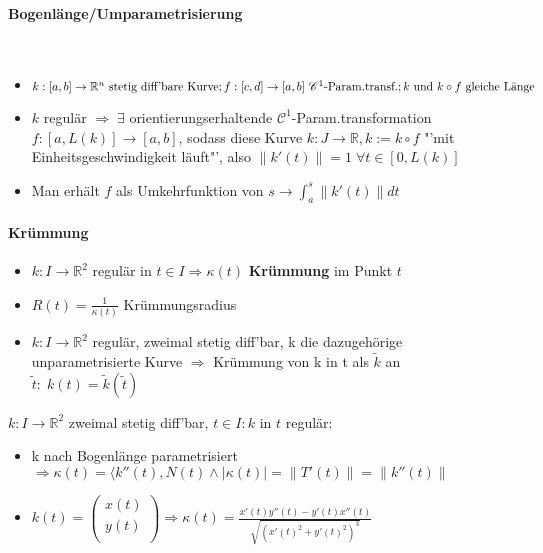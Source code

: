 \documentclass[paper=a3,paper=landscape, fontsize=9pt, DIV=30]{scrartcl}
\newcommand{\real}{{\mathbb{R}}}
\begin{document}
\begin{multicols*}{4}
  \paragraph{Bogenlänge/Umparametrisierung}\hspace{0pt} \\
\begin{itemize}
	\item   $k: [a,b] \rightarrow \real^n \ \text{stetig diff'bare Kurve};\\ f:[c,d] \rightarrow [a,b] \ \mathscr{C}^1\text{-Param.transf.}; k \ \text{und}\ k \circ f \ \text{gleiche Länge} $
	\item $k$ regulär $\Rightarrow\;\exists$ orientierungserhaltende $\mathscr{C}^1$-Param.transformation $f : [a,L(k)] \rightarrow [a,b]$, sodass diese Kurve $k: J \rightarrow \real, k := k \circ f$ "'mit Einheitsgeschwindigkeit läuft"', also $\lVert k'(t) \rVert = 1 \; \forall t \in [0,L(k)]$
	\item Man erhält $f$ als Umkehrfunktion von $s \rightarrow \int_{a}^{s} \lVert k'(t)\rVert dt$
\end{itemize}

  \paragraph{Krümmung}
  \begin{itemize}
  	\item $k: I \rightarrow \real^2$ regulär in $t \in I \Rightarrow \kappa(t)$ \textbf{Krümmung} im Punkt $t$
  	\item $R(t) = \frac{1}{\kappa(t)}$ Krümmungsradius
  	\item $k: I \rightarrow \real^2$ regulär, zweimal stetig diff'bar, k die dazugehörige unparametrisierte Kurve $\Rightarrow$ Krümmung von k in t als $\tilde{k}$ an $\tilde{t}:\;k(t)=\tilde{k}(\tilde{t})$
  \end{itemize}
	$k: I \rightarrow \real^2$ zweimal stetig diff'bar, $t \in I: k$ in $t$ regulär:
	\begin{itemize}
		\item k nach Bogenlänge parametrisiert $\Rightarrow \kappa(t)=\langle k''(t), N(t) \wedge \lvert \kappa(t)\rvert = \lVert T'(t) \rVert = \lVert k''(t) \rVert$
		\item $k(t) =
		\begin{pmatrix}
			x(t)\\y(t)\\
		\end{pmatrix}
		\Rightarrow \kappa(t)=\frac{x'(t)y''(t)-y'(t)x''(t)}{\sqrt{(x'(t)^2+y'(t)^2)^3}}$
	\end{itemize}

\end{multicols*}
\end{document}
